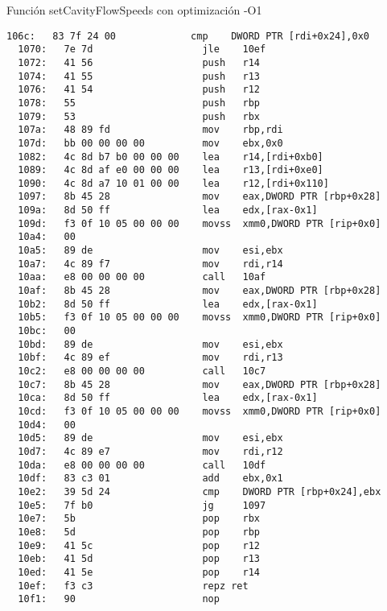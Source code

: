 {\center\large{Función setCavityFlowSpeeds con optimización -O1}}
\begin{lstlisting}[]
  106c:   83 7f 24 00             cmp    DWORD PTR [rdi+0x24],0x0
  1070:   7e 7d                   jle    10ef
  1072:   41 56                   push   r14
  1074:   41 55                   push   r13
  1076:   41 54                   push   r12
  1078:   55                      push   rbp
  1079:   53                      push   rbx
  107a:   48 89 fd                mov    rbp,rdi
  107d:   bb 00 00 00 00          mov    ebx,0x0
  1082:   4c 8d b7 b0 00 00 00    lea    r14,[rdi+0xb0]
  1089:   4c 8d af e0 00 00 00    lea    r13,[rdi+0xe0]
  1090:   4c 8d a7 10 01 00 00    lea    r12,[rdi+0x110]
  1097:   8b 45 28                mov    eax,DWORD PTR [rbp+0x28]
  109a:   8d 50 ff                lea    edx,[rax-0x1]
  109d:   f3 0f 10 05 00 00 00    movss  xmm0,DWORD PTR [rip+0x0]
  10a4:   00 
  10a5:   89 de                   mov    esi,ebx
  10a7:   4c 89 f7                mov    rdi,r14
  10aa:   e8 00 00 00 00          call   10af
  10af:   8b 45 28                mov    eax,DWORD PTR [rbp+0x28]
  10b2:   8d 50 ff                lea    edx,[rax-0x1]
  10b5:   f3 0f 10 05 00 00 00    movss  xmm0,DWORD PTR [rip+0x0] 
  10bc:   00 
  10bd:   89 de                   mov    esi,ebx
  10bf:   4c 89 ef                mov    rdi,r13
  10c2:   e8 00 00 00 00          call   10c7
  10c7:   8b 45 28                mov    eax,DWORD PTR [rbp+0x28]
  10ca:   8d 50 ff                lea    edx,[rax-0x1]
  10cd:   f3 0f 10 05 00 00 00    movss  xmm0,DWORD PTR [rip+0x0]
  10d4:   00 
  10d5:   89 de                   mov    esi,ebx
  10d7:   4c 89 e7                mov    rdi,r12
  10da:   e8 00 00 00 00          call   10df
  10df:   83 c3 01                add    ebx,0x1
  10e2:   39 5d 24                cmp    DWORD PTR [rbp+0x24],ebx
  10e5:   7f b0                   jg     1097
  10e7:   5b                      pop    rbx
  10e8:   5d                      pop    rbp
  10e9:   41 5c                   pop    r12
  10eb:   41 5d                   pop    r13
  10ed:   41 5e                   pop    r14
  10ef:   f3 c3                   repz ret 
  10f1:   90                      nop
\end{lstlisting}

